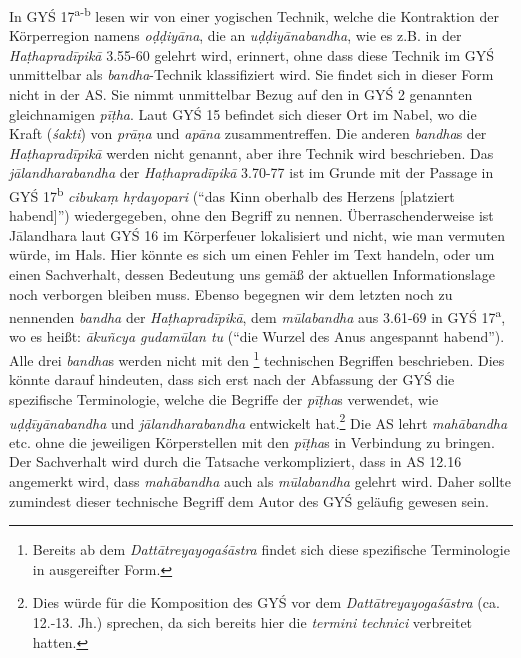 \documentclass[a4paper,12pt]{article}
\begin{document}
In GYŚ 17\textsuperscript{a-b} lesen wir von einer yogischen Technik, welche die Kontraktion der Körperregion namens \textit{oḍḍiyāna}, die an \textit{uḍḍiyānabandha}, wie es z.B. in der \textit{Haṭhapradīpikā} 3.55-60 gelehrt wird, erinnert, ohne dass diese Technik im GYŚ unmittelbar als \textit{bandha}-Technik klassifiziert wird. Sie findet sich in dieser Form nicht in der AS. Sie nimmt unmittelbar Bezug auf den in GYŚ 2 genannten gleichnamigen \textit{pīṭha}. Laut GYŚ 15 befindet sich dieser Ort im Nabel, wo die Kraft (\textit{śakti}) von \textit{prāṇa} und \textit{apāna} zusammentreffen. Die anderen \textit{bandha}s der \textit{Haṭhapradīpikā} werden nicht genannt, aber ihre Technik wird beschrieben. Das \textit{jālandharabandha} der \textit{Haṭhapradīpikā} 3.70-77 ist im Grunde mit der Passage in GYŚ 17\textsuperscript{b} \textit{cibukaṃ hṛdayopari } (``das Kinn oberhalb des Herzens [platziert habend]'') wiedergegeben, ohne den Begriff zu nennen. Überraschenderweise ist Jālandhara laut GYŚ 16 im Körperfeuer lokalisiert und nicht, wie man vermuten würde, im Hals. Hier könnte es sich um einen Fehler im Text handeln, oder um einen Sachverhalt, dessen Bedeutung uns gemäß der aktuellen Informationslage noch verborgen bleiben muss. Ebenso begegnen wir dem letzten noch zu nennenden \textit{bandha} der \textit{Haṭhapradīpikā}, dem \textit{mūlabandha} aus 3.61-69 in GYŚ 17\textsuperscript{a}, wo es heißt: \textit{ākuñcya gudamūlan tu} (``die Wurzel des Anus angespannt habend''). Alle drei \textit{bandha}s werden nicht mit den \footnote{Bereits ab dem \textit{Dattātreyayogaśāstra} findet sich diese spezifische Terminologie in ausgereifter Form.} technischen Begriffen beschrieben. Dies könnte darauf hindeuten, dass sich erst nach der Abfassung der GYŚ die spezifische Terminologie, welche die Begriffe der \textit{pīṭha}s verwendet, wie \textit{uḍḍīyānabandha} und \textit{jālandharabandha} entwickelt hat.\footnote{Dies würde für die Komposition des GYŚ vor dem \textit{Dattātreyayogaśāstra} (ca. 12.-13. Jh.) sprechen, da sich bereits hier die \textit{termini technici} verbreitet hatten.} Die AS lehrt \textit{mahābandha} etc. ohne die jeweiligen Körperstellen mit den \textit{pīṭha}s in Verbindung zu bringen. Der Sachverhalt wird durch die Tatsache verkompliziert, dass in AS 12.16 angemerkt wird, dass \textit{mahābandha} auch als \textit{mūlabandha} gelehrt wird. Daher sollte zumindest dieser technische Begriff dem Autor des GYŚ geläufig gewesen sein.
\end{document}
